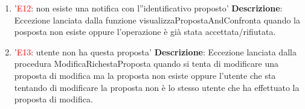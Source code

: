 \begin{enumerate}[label=\textbf{\arabic*.}]
    \item '\textcolor{red}{E12}: non esiste una notifica con l''identificativo proposto'\newline\newline
    \textbf{Descrizione}: Eccezione lanciata dalla funzione visualizzaPropostaAndConfronta quando la posposta non esiste oppure l'operazione è già stata accettata/rifiutata.

    \item '\textcolor{red}{E13}: utente non ha questa proposta' \newline\newline
    \textbf{Descrizione}: Eccezione lanciata dalla procedura ModificaRichestaProposta quando si tenta di modificare una proposta di modifica ma la proposta non esiste oppure l'utente che sta tentando di modificare la proposta non è lo stesso utente che ha effettuato la proposta di modifica.

\end{enumerate}
